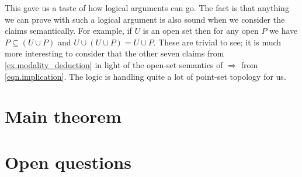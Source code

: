 \documentclass[11pt, oneside, article]{memoir}
\theoremstyle{plain}
\theoremstyle{definition}
\theoremstyle{remark}
\renewcommand{\ss}{\subseteq}
\newcommand{\imp}{\Rightarrow}
\begin{document}
This gave us a taste of how logical arguments can go. The fact is that anything we can prove with such a logical argument is also sound when we consider the claims semantically. For example, if $U$ is an open set then for any open $P$ we have $P\ss (U\cup P)$ and $U\cup(U\cup P)=U\cup P$. These are trivial to see; it is much more interesting to consider that the other seven claims from \cref{ex.modality_deduction} in light of the open-set semantics of $\imp$ from \eqref{eqn.implication}. The logic is handling quite a lot of point-set topology for us.



\chapter{Main theorem}

\chapter{Open questions}
\end{document}
